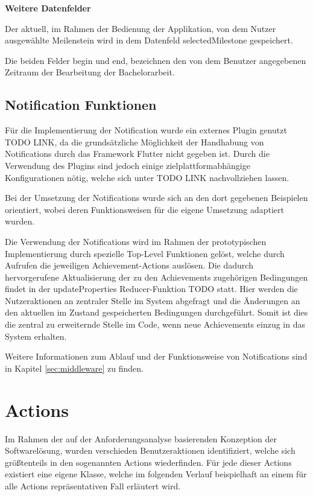 \documentclass[bibliography=totoc,listof=totoc,BCOR=5mm,DIV=12,oneside]{scrbook}
\begin{document}
\par \bigskip \textbf{Weitere Datenfelder}
\par Der aktuell, im Rahmen der Bedienung der Applikation, von dem Nutzer ausgewählte Meilenstein wird in dem Datenfeld selectedMilestone gespeichert. 
\par \medskip Die beiden Felder begin und end, bezeichnen den von dem Benutzer angegebenen Zeitraum der Bearbeitung der Bachelorarbeit.

\newpage
\subsection{Notification Funktionen}
\par Für die Implementierung der Notification wurde ein externes Plugin genutzt TODO LINK, da die grundsätzliche Möglichkeit der Handhabung von Notifications durch das Framework Flutter nicht gegeben ist. Durch die Verwendung des Plugins sind jedoch einige zielplattformabhängige Konfigurationen nötig, welche sich unter TODO LINK nachvollziehen lassen.
\par \medskip Bei der Umsetzung der Notifications wurde sich an den dort gegebenen Beispielen orientiert, wobei deren Funktionsweisen für die eigene Umsetzung adaptiert wurden.
\par Die Verwendung der Notifications wird im Rahmen der prototypischen Implementierung durch spezielle Top-Level Funktionen gelöst, welche durch Aufrufen die jeweiligen Achievement-Actions auslösen. Die dadurch hervorgerufene Aktualisierung der zu den Achievements zugehörigen Bedingungen findet in der updateProperties Reducer-Funktion TODO statt. Hier werden die Nutzeraktionen an zentraler Stelle im System abgefragt und die Änderungen an den aktuellen im Zustand gespeicherten Bedingungen durchgeführt. Somit ist dies die zentral zu erweiternde Stelle im Code, wenn neue Achievements einzug in das System erhalten.
\par \bigskip Weitere Informationen zum Ablauf und der Funktionsweise von Notifications sind in Kapitel \ref{sec:middleware} zu finden.

\section{Actions}
\par Im Rahmen der auf der Anforderungsanalyse basierenden Konzeption der Softwarelösung, wurden verschieden Benutzeraktionen identifiziert, welche sich größtenteils in den sogenannten Actions wiederfinden.
Für jede dieser Actions existiert eine eigene Klasse, welche im folgenden Verlauf beispielhaft an einem für alle Actions repräsentativen Fall erläutert wird.
\end{document}
